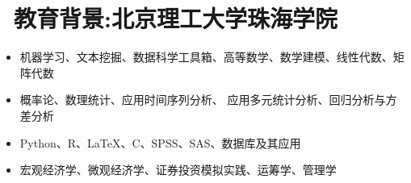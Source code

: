 \documentclass{resume}
\begin{document}
\begin{figure}[h]
\begin{minipage}[h]{0.4\linewidth}
\begin{spacing}{1.5}
\begin{tabular*}{\textwidth}{l@{\extracolsep{\fill}}r}
\end{tabular*}
\end{spacing}
\end{minipage} 
\qquad
\begin{minipage}[h]{0.55\linewidth}
\end{minipage}
\end{figure}
\vspace{0.05mm}

\section{\faGraduationCap\  教育背景:北京理工大学珠海学院}
\begin{itemize}[parsep=0.5ex]
  \item 机器学习、文本挖掘、数据科学工具箱、高等数学、数学建模、线性代数、矩阵代数
  \item 概率论、数理统计、应用时间序列分析、
应用多元统计分析、回归分析与方差分析
  \item Python、R、LaTeX、C、SPSS、SAS、数据库及其应用
  \item 宏观经济学、微观经济学、证券投资模拟实践、运筹学、管理学
\end{itemize}
\end{document}
